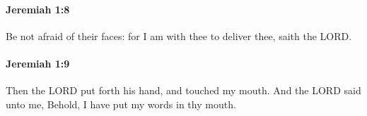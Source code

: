 		\paragraph{Jeremiah 1:8} %
			\label{JEREMIAH-1-8}

			Be not afraid of their faces: for I am with thee to deliver thee, saith the LORD.


		\paragraph{Jeremiah 1:9} %
			\label{JEREMIAH-1-9}

			Then the LORD put forth his hand, and touched my mouth. And the LORD said unto me, Behold, I have put my words in thy mouth.


